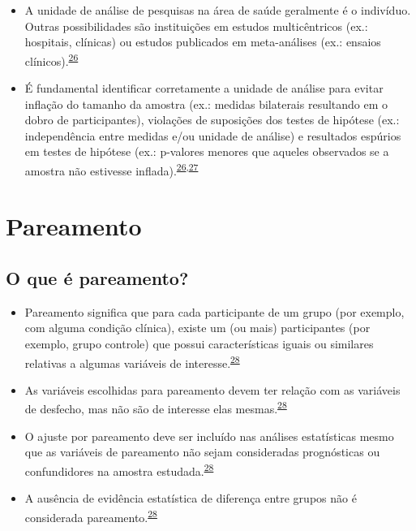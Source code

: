 \documentclass[
]{book}
\begin{document}
\begin{itemize}
\item
  A unidade de análise de pesquisas na área de saúde geralmente é o indivíduo. Outras possibilidades são instituições em estudos multicêntricos (ex.: hospitais, clínicas) ou estudos publicados em meta-análises (ex.: ensaios clínicos).\textsuperscript{\protect\hyperlink{ref-Altman1997}{26}}
\item
  É fundamental identificar corretamente a unidade de análise para evitar inflação do tamanho da amostra (ex.: medidas bilaterais resultando em o dobro de participantes), violações de suposições dos testes de hipótese (ex.: independência entre medidas e/ou unidade de análise) e resultados espúrios em testes de hipótese (ex.: p-valores menores que aqueles observados se a amostra não estivesse inflada).\textsuperscript{\protect\hyperlink{ref-Altman1997}{26},\protect\hyperlink{ref-Matthews1990}{27}}
\end{itemize}

\hypertarget{pareamento}{%
\section{Pareamento}\label{pareamento}}

\hypertarget{o-que-uxe9-pareamento}{%
\subsection{O que é pareamento?}\label{o-que-uxe9-pareamento}}

\begin{itemize}
\item
  Pareamento significa que para cada participante de um grupo (por exemplo, com alguma condição clínica), existe um (ou mais) participantes (por exemplo, grupo controle) que possui características iguais ou similares relativas a algumas variáveis de interesse.\textsuperscript{\protect\hyperlink{ref-Bland1994}{28}}
\item
  As variáveis escolhidas para pareamento devem ter relação com as variáveis de desfecho, mas não são de interesse elas mesmas.\textsuperscript{\protect\hyperlink{ref-Bland1994}{28}}
\item
  O ajuste por pareamento deve ser incluído nas análises estatísticas mesmo que as variáveis de pareamento não sejam consideradas prognósticas ou confundidores na amostra estudada.\textsuperscript{\protect\hyperlink{ref-Bland1994}{28}}
\item
  A ausência de evidência estatística de diferença entre grupos não é considerada pareamento.\textsuperscript{\protect\hyperlink{ref-Bland1994}{28}}
\end{itemize}
\end{document}
